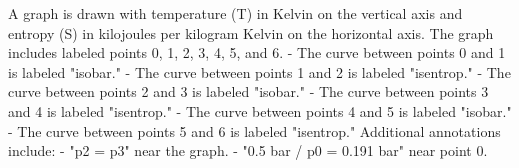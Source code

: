 A graph is drawn with temperature (T) in Kelvin on the vertical axis and entropy (S) in kilojoules per kilogram Kelvin on the horizontal axis. The graph includes labeled points 0, 1, 2, 3, 4, 5, and 6.  
- The curve between points 0 and 1 is labeled "isobar."  
- The curve between points 1 and 2 is labeled "isentrop."  
- The curve between points 2 and 3 is labeled "isobar."  
- The curve between points 3 and 4 is labeled "isentrop."  
- The curve between points 4 and 5 is labeled "isobar."  
- The curve between points 5 and 6 is labeled "isentrop."  
Additional annotations include:  
- "p2 = p3" near the graph.  
- "0.5 bar / p0 = 0.191 bar" near point 0.